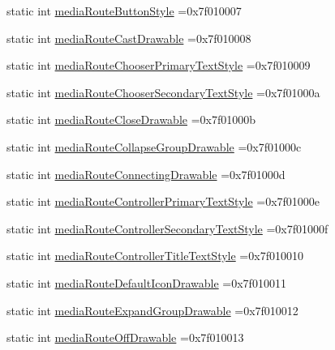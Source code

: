 \begin{DoxyCompactItemize}
static int \hyperlink{classandroid_1_1support_1_1v7_1_1appcompat_1_1R_1_1attr_a5c203003009691f3e157455828903bfb}{media\+Route\+Button\+Style} =0x7f010007
\item 
static int \hyperlink{classandroid_1_1support_1_1v7_1_1appcompat_1_1R_1_1attr_a0f07391bf841dd7c94d92679c2d1eb89}{media\+Route\+Cast\+Drawable} =0x7f010008
\item 
static int \hyperlink{classandroid_1_1support_1_1v7_1_1appcompat_1_1R_1_1attr_a02ad3e1799be719791afeb4555226ef0}{media\+Route\+Chooser\+Primary\+Text\+Style} =0x7f010009
\item 
static int \hyperlink{classandroid_1_1support_1_1v7_1_1appcompat_1_1R_1_1attr_a44ae777de2f2a894e734c6d1877c7100}{media\+Route\+Chooser\+Secondary\+Text\+Style} =0x7f01000a
\item 
static int \hyperlink{classandroid_1_1support_1_1v7_1_1appcompat_1_1R_1_1attr_aeba04d711d7391c1136a642cc3890891}{media\+Route\+Close\+Drawable} =0x7f01000b
\item 
static int \hyperlink{classandroid_1_1support_1_1v7_1_1appcompat_1_1R_1_1attr_adae1b120a8cba2dfa6f1416ccc049b02}{media\+Route\+Collapse\+Group\+Drawable} =0x7f01000c
\item 
static int \hyperlink{classandroid_1_1support_1_1v7_1_1appcompat_1_1R_1_1attr_a689f21defa5306972fa19e82bd3397d1}{media\+Route\+Connecting\+Drawable} =0x7f01000d
\item 
static int \hyperlink{classandroid_1_1support_1_1v7_1_1appcompat_1_1R_1_1attr_ad8e3c0cf6f0d79f04c3f2cdf1aa85e9b}{media\+Route\+Controller\+Primary\+Text\+Style} =0x7f01000e
\item 
static int \hyperlink{classandroid_1_1support_1_1v7_1_1appcompat_1_1R_1_1attr_a9362b84480d17fe4a60e7711a92705fa}{media\+Route\+Controller\+Secondary\+Text\+Style} =0x7f01000f
\item 
static int \hyperlink{classandroid_1_1support_1_1v7_1_1appcompat_1_1R_1_1attr_a6c2964ff4d1ae95188e6e08d77da5a8d}{media\+Route\+Controller\+Title\+Text\+Style} =0x7f010010
\item 
static int \hyperlink{classandroid_1_1support_1_1v7_1_1appcompat_1_1R_1_1attr_a617bcbc08d02eaed80c601a84d0134be}{media\+Route\+Default\+Icon\+Drawable} =0x7f010011
\item 
static int \hyperlink{classandroid_1_1support_1_1v7_1_1appcompat_1_1R_1_1attr_aad8a33b84cf690016c01160980c54276}{media\+Route\+Expand\+Group\+Drawable} =0x7f010012
\item 
static int \hyperlink{classandroid_1_1support_1_1v7_1_1appcompat_1_1R_1_1attr_a10f7595581264a30fea21acb31d26330}{media\+Route\+Off\+Drawable} =0x7f010013

\end{DoxyCompactItemize}
